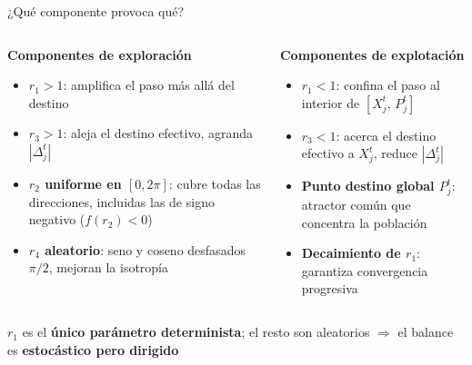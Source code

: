 \documentclass[aspectratio=169]{beamer}
\newcommand{\highlight}[1]{\textcolor{myblue}{\textbf{#1}}}
\newcommand{\good}[1]{\textcolor{mygreen}{\textbf{#1}}}
\renewcommand{\accent}[1]{\textcolor{myyellow}{\textbf{#1}}}
\begin{document}
\begin{frame}{¿Qué componente provoca qué?}
  \begin{columns}[T]
      \begin{block}{\good{Componentes de exploración}}
        \begin{itemize}
          \item \textbf{$r_1 > 1$}: amplifica el paso más allá del destino
          \item \textbf{$r_3 > 1$}: aleja el destino efectivo, agranda $|\Delta_j^t|$
          \item \textbf{$r_2$ uniforme en $[0,2\pi]$}: cubre todas las direcciones, incluidas las de signo negativo ($f(r_2) < 0$)
          \item \textbf{$r_4$ aleatorio}: seno y coseno desfasados $\pi/2$, mejoran la isotropía
        \end{itemize}
      \end{block}

      \begin{alertblock}{\accent{Componentes de explotación}}
        \begin{itemize}
          \item \textbf{$r_1 < 1$}: confina el paso al interior de $[X_j^t,\, P_j^t]$
          \item \textbf{$r_3 < 1$}: acerca el destino efectivo a $X_j^t$, reduce $|\Delta_j^t|$
          \item \textbf{Punto destino global $P_j^t$}: atractor común que concentra la población
          \item \textbf{Decaimiento de $r_1$}: garantiza convergencia progresiva
        \end{itemize}
      \end{alertblock}
  \end{columns}

  \vspace{0.5em}
  \begin{center}
    \small
    $r_1$ es el \highlight{único parámetro determinista}; el resto son aleatorios $\Rightarrow$ el balance es \textbf{estocástico pero dirigido}
  \end{center}
\end{frame}
\end{document}

